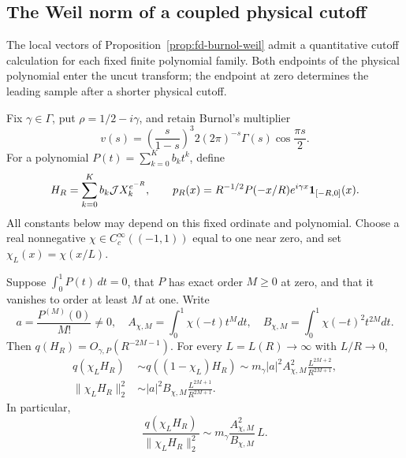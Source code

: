 \subsection{The Weil norm of a coupled physical cutoff}
\label{subsec:burnol-coupled-cutoff}
The local vectors of
Proposition~\ref{prop:fd-burnol-weil} admit a quantitative
cutoff calculation for each fixed finite polynomial family.
Both endpoints of the physical polynomial enter the
uncut transform; the endpoint at zero determines the leading
sample after a shorter physical cutoff.

Fix $\gamma\in\Gamma$, put $\rho=1/2-i\gamma$, and retain
Burnol's multiplier
\[
 v(s)=\left(\frac{s}{1-s}\right)^3
       2(2\pi)^{-s}\Gamma(s)\cos\frac{\pi s}{2}.
\]
For a polynomial $P(t)=\sum_{k=0}^K b_kt^k$, define
\[
 H_R=\sum_{k=0}^K b_k\mathcal JX_k^{e^{-R}},
 \qquad
 p_R(x)=R^{-1/2}P(-x/R)e^{i\gamma x}
                    {\bf1}_{[-R,0]}(x).
\]
All constants below may depend on this fixed ordinate and
polynomial. Choose a real nonnegative
$\chi\in C_c^\infty((-1,1))$ equal to one near zero, and set
$\chi_L(x)=\chi(x/L)$.

\begin{proposition}\label{prop:burnol-coupled-cutoff}
Suppose $\int_0^1P(t)\,dt=0$, that $P$ has exact order $M\ge0$
at zero, and that it vanishes to order at least $M$ at one.
Write
\[
 a=\frac{P^{(M)}(0)}{M!}\ne0,\quad
 A_{\chi,M}=\int_0^1\chi(-t)t^Mdt,\quad
 B_{\chi,M}=\int_0^1\chi(-t)^2t^{2M}dt.
\]
Then $q(H_R)=O_{\gamma,P}(R^{-2M-1})$. For every
$L=L(R)\to\infty$ with $L/R\to0$,
\begin{align}
 q(\chi_LH_R)
 &\sim q((1-\chi_L)H_R)
 \sim m_\gamma|a|^2A_{\chi,M}^2
                  \frac{L^{2M+2}}{R^{2M+1}},
                 \label{eq:burnol-cutoff-q}\\
 \|\chi_LH_R\|_2^2
 &\sim |a|^2B_{\chi,M}
                  \frac{L^{2M+1}}{R^{2M+1}}.
                 \label{eq:burnol-cutoff-physical}
\end{align}
In particular,
\[
 \frac{q(\chi_LH_R)}{\|\chi_LH_R\|_2^2}
 \sim m_\gamma\frac{A_{\chi,M}^2}{B_{\chi,M}}\,L.
\]
\end{proposition}


